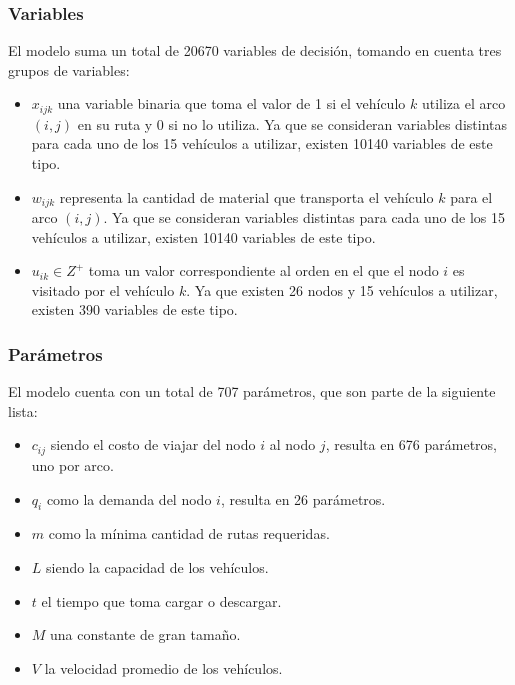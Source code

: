 \documentclass{amsart}
\begin{document}
            \subsubsection{Variables}
            El modelo suma un total de 20670 variables de decisión, tomando en cuenta tres grupos de variables: 
            \begin{itemize}
                \item $x_{ijk}$ una variable binaria que toma el valor de 1 si el vehículo $k$ utiliza el arco $(i,j)$ en su ruta y 0 si no lo utiliza. Ya que se consideran variables distintas para cada uno de los 15 vehículos a utilizar, existen 10140 variables de este tipo.
                \item $w_{ijk}$ representa la cantidad de material que transporta el vehículo $k$ para el arco $(i,j)$. Ya que se consideran variables distintas para cada uno de los 15 vehículos a utilizar, existen 10140 variables de este tipo.
                \item $u_{ik} \in Z^+$ toma un valor correspondiente al orden en el que el nodo $i$ es visitado por el vehículo $k$. Ya que existen 26 nodos y 15 vehículos a utilizar, existen 390 variables de este tipo.
            \end{itemize}
            

            \subsubsection{Parámetros}
            El modelo cuenta con un total de 707 parámetros, que son parte de la siguiente lista:
            \begin{itemize}
                \item $c_{ij}$ siendo el costo de viajar del nodo $i$ al nodo $j$, resulta en 676 parámetros, uno por arco.
                \item $q_i$ como la demanda del nodo $i$, resulta en 26 parámetros.
                \item $m$ como la mínima cantidad de rutas requeridas.
                \item $L$ siendo la capacidad de los vehículos.
                \item $t$ el tiempo que toma cargar o descargar.
                \item $M$ una constante de gran tamaño.
                \item $V$ la velocidad promedio de los vehículos.
            \end{itemize}
\end{document}
